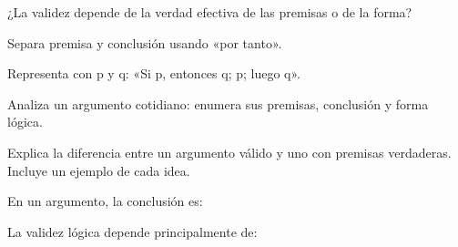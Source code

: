 \begin{activity}[id=dia-09-corta-04,type=short,weight=1]

¿La validez depende de la verdad efectiva de las premisas o de la forma?

\end{activity}

\begin{activity}[id=dia-09-corta-05,type=short,weight=1]

Separa premisa y conclusión usando «por tanto».

\end{activity}

\begin{activity}[id=dia-09-corta-06,type=short,weight=1]

Representa con p y q: «Si p, entonces q; p; luego q».

\end{activity}

\begin{activity}[id=dia-09-desarrollo-01,type=long,weight=2]

Analiza un argumento cotidiano: enumera sus premisas, conclusión y forma lógica.

\end{activity}

\begin{activity}[id=dia-09-desarrollo-02,type=long,weight=2]

Explica la diferencia entre un argumento válido y uno con premisas verdaderas. Incluye un ejemplo de cada idea.

\end{activity}

\begin{activity}[id=dia-09-opcion-01,type=choice,weight=1]

En un argumento, la conclusión es:





\end{activity}

\begin{activity}[id=dia-09-opcion-02,type=choice,weight=1]

La validez lógica depende principalmente de:





\end{activity}


